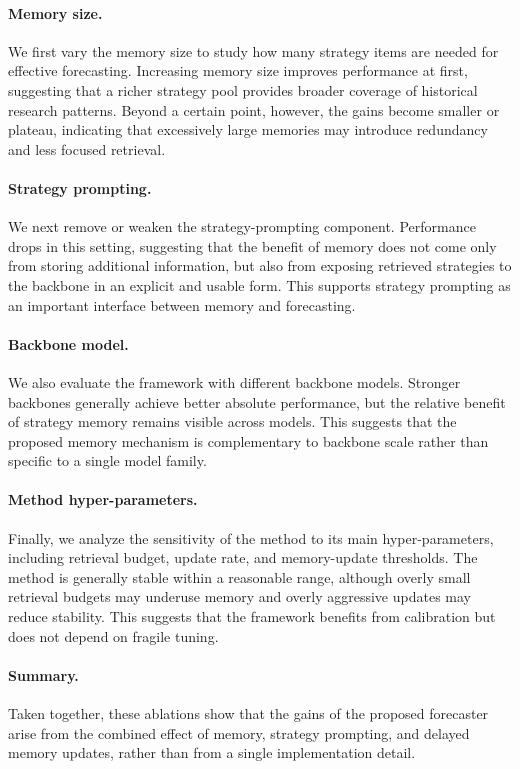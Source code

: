 \documentclass{article} %
\begin{document}
\paragraph{Memory size.}
We first vary the memory size to study how many strategy items are needed for effective forecasting. Increasing memory size improves performance at first, suggesting that a richer strategy pool provides broader coverage of historical research patterns. Beyond a certain point, however, the gains become smaller or plateau, indicating that excessively large memories may introduce redundancy and less focused retrieval.

\paragraph{Strategy prompting.}
We next remove or weaken the strategy-prompting component. Performance drops in this setting, suggesting that the benefit of memory does not come only from storing additional information, but also from exposing retrieved strategies to the backbone in an explicit and usable form. This supports strategy prompting as an important interface between memory and forecasting.

\paragraph{Backbone model.}
We also evaluate the framework with different backbone models. Stronger backbones generally achieve better absolute performance, but the relative benefit of strategy memory remains visible across models. This suggests that the proposed memory mechanism is complementary to backbone scale rather than specific to a single model family.

\paragraph{Method hyper-parameters.}
Finally, we analyze the sensitivity of the method to its main hyper-parameters, including retrieval budget, update rate, and memory-update thresholds. The method is generally stable within a reasonable range, although overly small retrieval budgets may underuse memory and overly aggressive updates may reduce stability. This suggests that the framework benefits from calibration but does not depend on fragile tuning.

\paragraph{Summary.}
Taken together, these ablations show that the gains of the proposed forecaster arise from the combined effect of memory, strategy prompting, and delayed memory updates, rather than from a single implementation detail.
\end{document}

